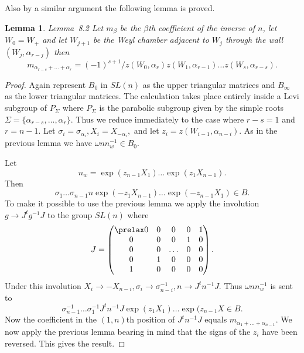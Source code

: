 \documentclass{memo-l}
\newtheorem{lemma}[theorem]{Lemma}
\theoremstyle{definition}
\theoremstyle{remark}
\numberwithin{section}{chapter}
\numberwithin{equation}{chapter}
\begin{document}
{\medskip}

Also by a similar argument the following lemma is proved.

\medskip

\begin{lemma}{Lemma\ 8.2}  Let $m_{{\beta}}$ be the ${\beta}$th coefficient of 
the inverse of $n$, let $W_{0}=W_{+}$ and let $W_{j+1}$ be the Weyl chamber 
adjacent to $W_{j}$ through the wall $(W_{j},{\alpha}_{r-j})$ then
$$
m_{\alpha_{r-s}+\ldots +\alpha_{r}} = (-1)^{s+1}/z(W_{0},
{\alpha}_{r})z(W_{1},{\alpha}_{r-1})\ldots z(W_{s},{\alpha}_{r-s}) .
$$
\end{lemma}

\begin{proof}    Again represent $B_{0}$ in $SL(n)$ as the upper triangular 
matrices and
$B_{{\infty}}$ as the lower triangular matrices. 
 The calculation takes place entirely inside a Levi subgroup of $P_{{\Sigma}}$ 
where $P_{{\Sigma}}$ is the parabolic subgroup given by the simple roots 
${\Sigma} = \{{\alpha}_{r-s},\ldots ,{\alpha}_r\}$.  Thus we reduce immediately 
to the case where $r-s = 1$ and $r = n-1$. 
 Let ${\sigma}_{i} = {\sigma}_{\alpha_i}, X_{i} = 
X_{-\alpha_i},$ and let $z_{i} = z(W_{i-1},{\alpha}_{n-i})$. 
 As in the previous lemma we have ${\omega}nn_{w}^{-1} \in B_{0}$. 
				 
Let
$$
n_{w} = \exp(z_{n-1}X_{1})\ldots \exp(z_{1}X_{n-1}).
$$
Then 
$$
{\sigma}_{1}\ldots {\sigma}_{n-1}n\exp(-z_{1}X_{n-1})\ldots \exp(-z_{n-1}X_{1}) 
\in B .
$$
To make it possible to use the previous lemma we apply the involution $g {\to} 
J^{t}g^{-1}J$ to the group $SL(n)$ where 
$$
J =
\begin{pmatrix} \prelax  0 & 0 & 0 & 0 & 1 \\
0 & 0 & 0 & 1 & 0 \\
0 & 0 & \ldots & 0 & 0 \\
0 & 1 & 0 & 0 & 0 \\
1 & 0 & 0 & 0 & 0 \end{pmatrix} .
$$
Under this involution $X_{i} {\to} -X_{n-i}, {\sigma}_{i} {\to} 
{\sigma}_{n-i}^{-1}, n {\to} J^{t}n^{-1}J$. 
 Thus ${\omega}nn_{w}^{-1}$ is sent to
$$
\sigma_{n-1}^{-1}\ldots {\sigma}_{1}^{-1}J^{t}n^{-1}J\exp(z_{1}X_{1})\ldots 
\exp(z_{n-1}X \in B .
$$
Now the coefficient in the $(1,n)$th position of $J^{t}n^{-1}J$ equals 
$m_{\alpha_1+\ldots +\alpha_{n-1}}$.  We now apply the 
previous lemma bearing in mind that the signs of the $z_{i}$ have been 
reversed. 
 This gives the result.	  
\end{proof} 
\end{document}

